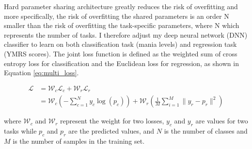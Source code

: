 Hard parameter sharing architecture greatly reduces the risk of overfitting \cite{baxter1997} and more specifically, the risk of overfitting the shared parameters is an order N smaller than the risk of overfitting the task-specific parameters, where N which represents the number of tasks. I therefore adjust my deep neural network (DNN) classifier to learn on both classification task (mania levels) and regression task (YMRS scores). The joint loss function is defined as the weighted sum of cross entropy loss for classification and the Euclidean loss for regression, as shown in Equation \ref{eq:multi_loss}.

\begin{equation} 
\begin{split}
 \mathcal{L} & = \mathcal{W}_c \mathcal{L}_c + \mathcal{W}_r \mathcal{L}_r \\
             & = \mathcal{W}_c (-\sum_{c=1}^N y_c \log(p_c)) + \mathcal{W}_r (\frac{1}{M} \sum_{i=1}^M \parallel y_r - p_r \parallel ^ 2)
\end{split}
\label{eq:multi_loss}
\end{equation}

where $\mathcal{W}_c$ and $\mathcal{W}_r$ represent the weight for two losses, $y_c$ and $y_r$ are values for two tasks while $p_c$ and $p_r$ are the predicted values, and $N$ is the number of classes and $M$ is the number of samples in the training set.
